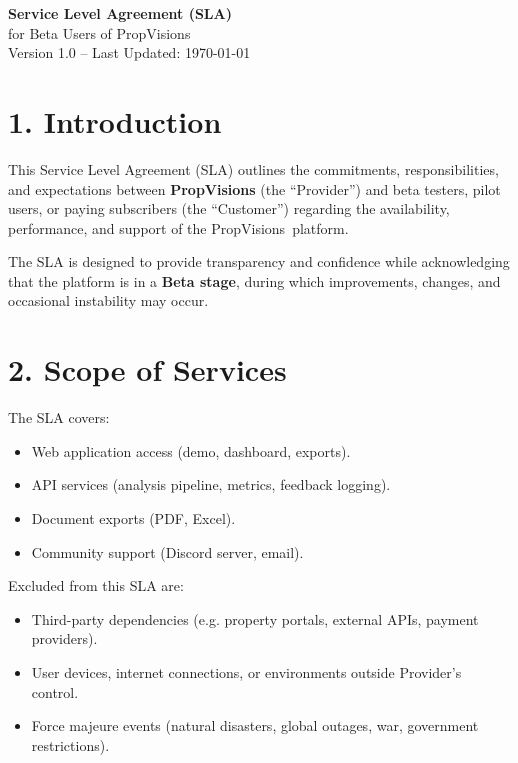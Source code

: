 \documentclass[11pt,a4paper]{article}
\newcommand{\product}{PropVisions}
\begin{document}
\begin{center}
  {\Huge \bf Service Level Agreement (SLA)} \\[6pt]
  {\large for Beta Users of \product} \\[12pt]
  {\small Version 1.0 -- Last Updated: \today}
\end{center}

\section*{1. Introduction}
This Service Level Agreement (SLA) outlines the commitments, responsibilities, and expectations between \textbf{\product} (the ``Provider'') and beta testers, pilot users, or paying subscribers (the ``Customer'') regarding the availability, performance, and support of the \product\ platform.

The SLA is designed to provide transparency and confidence while acknowledging that the platform is in a \textbf{Beta stage}, during which improvements, changes, and occasional instability may occur.

\section*{2. Scope of Services}
The SLA covers:
\begin{itemize}[left=0pt]
  \item Web application access (demo, dashboard, exports).
  \item API services (analysis pipeline, metrics, feedback logging).
  \item Document exports (PDF, Excel).
  \item Community support (Discord server, email).
\end{itemize}

Excluded from this SLA are:
\begin{itemize}[left=0pt]
  \item Third-party dependencies (e.g. property portals, external APIs, payment providers).
  \item User devices, internet connections, or environments outside Provider’s control.
  \item Force majeure events (natural disasters, global outages, war, government restrictions).
\end{itemize}
\end{document}
